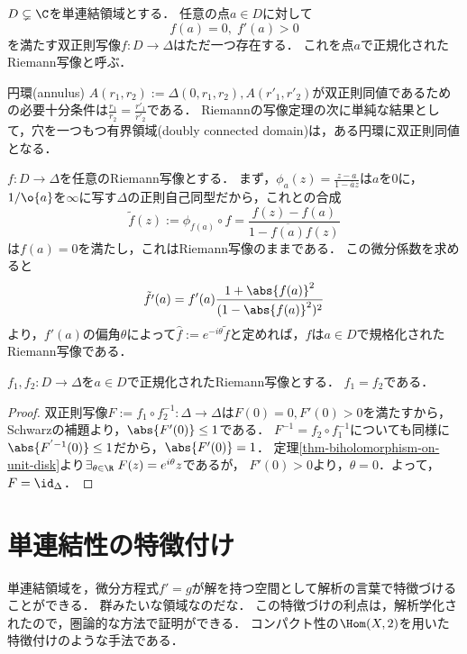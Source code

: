 \documentclass[uplatex, dvipdfmx]{jsreport}
\begin{document}
\begin{theorem}\label{thm-Riemann-mapping-theorem}
    $D\subsetneq\C$を単連結領域とする．
    任意の点$a\in D$に対して
    \[f(a)=0,\;f'(a)>0\]
    を満たす双正則写像$f:D\to\Delta$はただ一つ存在する．
    これを点$a$で正規化されたRiemann写像と呼ぶ．
\end{theorem}
\begin{remark}[単連結でない領域の消息]
    円環(annulus) $A(r_1,r_2):=\Delta(0,r_1,r_2),A(r'_1,r'_2)$が双正則同値であるための必要十分条件は$\frac{r_1}{r_2}=\frac{r'_1}{r'_2}$である．
    Riemannの写像定理の次に単純な結果として，穴を一つもつ有界領域(doubly connected domain)は，ある円環に双正則同値となる．
\end{remark}

\begin{discussion}
    $f:D\to\Delta$を任意のRiemann写像とする．
    まず，$\phi_a(z)=\frac{z-a}{1-\overline{a}z}$は$a$を$0$に，$1/\o{a}$を$\infty$に写す$\Delta$の正則自己同型だから，これとの合成
    \[\tilde{f}(z):=\phi_{f(a)}\circ f=\frac{f(z)-f(a)}{1-\overline{f(a)}f(z)}\]
    は$f(a)=0$を満たし，これはRiemann写像のままである．
    この微分係数を求めると
    \[\tilde{f'}(a)=f'(a)\frac{1+\abs{f(a)}^2}{(1-\abs{f(a)}^2)^2}\]
    より，$f'(a)$の偏角$\theta$によって$\hat{f}:=e^{-i\theta}\tilde{f}$と定めれば，$\hat{f}$は$a\in D$で規格化されたRiemann写像である．
\end{discussion}

\begin{lemma}
    $f_1,f_2:D\to\Delta$を$a\in D$で正規化されたRiemann写像とする．
    $f_1=f_2$である．
\end{lemma}
\begin{proof}
    双正則写像$F:=f_1\circ f_2^{-1}:\Delta\to\Delta$は$F(0)=0,F'(0)>0$を満たすから，
    Schwarzの補題より，$\abs{F'(0)}\le 1$である．
    $F^{-1}=f_2\circ f_1^{-1}$についても同様に$\abs{F^{'-1}(0)}\le 1$だから，$\abs{F'(0)}=1$．
    定理\ref{thm-biholomorphism-on-unit-disk}より$\exists_{\theta\in\R}\;F(z)=e^{i\theta}z$であるが，
    $F'(0)>0$より，$\theta=0$．よって，$F=\id_\Delta$．
\end{proof}

\section{単連結性の特徴付け}

\begin{tcolorbox}[colframe=ForestGreen, colback=ForestGreen!10!white,breakable,colbacktitle=ForestGreen!40!white,coltitle=black,fonttitle=\bfseries\sffamily,
title=]
    単連結領域を，微分方程式$f'=g$が解を持つ空間として解析の言葉で特徴づけることができる．
    群みたいな領域なのだな．
    この特徴づけの利点は，解析学化されたので，圏論的な方法で証明ができる．
    コンパクト性の$\Hom(X,2)$を用いた特徴付けのような手法である．
\end{tcolorbox}
\end{document}

